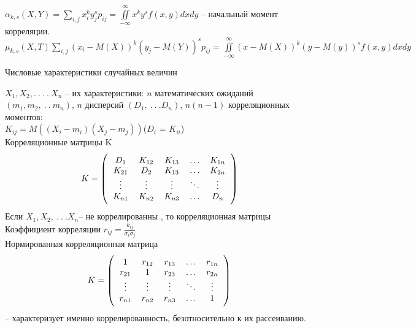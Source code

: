 \documentclass[russian, 12pt, fleqn]{article}
\begin{document}
$\alpha_{k,s} (X,Y) = \sum\limits_{i, j} x_i^k y_j^s p_{ij} =  \displaystyle{\iint\limits_{-\infty}^{\infty}} x^k y^s f(x, y) dx dy  $ -- начальный момент корреляции.\\ 
$\mu_{k,s}(X, T)  \sum\limits_{i, j} (x_i - M(X))^k (y_j - M(Y))^s p_{i j} = \displaystyle{\iint\limits_{-\infty}^{\infty}}(x-M(X))^k(y-M(y))^s f(x, y) dxdy$
\begin{center}
$\textbf{Числовые характеристики случайных величин}$
\end{center}
$X_1, X_2, .\ .\ .\ .\ X_n$ -- их характеристики: $n$ математических ожиданий $(m_1, m_2, \ .\ . \  m_n)$, $n$ дисперсий $(D_1, \ .\ .\ . D_n)$,  $n(n-1)$ корреляционных моментов:\\
$K_{ij} = M((X_i - m_i)(X_j - m_j))$($D_i$ = $K_{ii}$)\\
Корреляционные матрицы K
$$
K=\left(\begin{tabular}{c c c c c}
\(D_1\) & \(K_{12}\) & \(K_{13}\) & \(\ldots\) & \(K_{1n}\) \\
\(K_{21}\) &\( D_2\) & \(K_{13}\) & \(\ldots\) &\( K_{2n}\)\\
\(\vdots\) & \(\vdots\) & \(\vdots\) & \(\ddots\) & \(\vdots\) \\
\(K_{n1}\)& \(K_{n2}\) &\( K_{n3}\) & \(\ldots\) & \(D_n\)\\
\end{tabular}\right)$$
Если $X_1, X_2, \ .\ .\ . X_n$-- не коррелированны , то корреляционная матрицы 
Коэффициент корреляции $r_{ij} = \frac{k_{ij}}{\sigma_i \sigma_j}$\\
Нормированная корреляционная матрица
$$
K=\left(\begin{tabular}{c c c c c}
\(1\) & \(r_{12}\) & \(r_{13}\) & \(\ldots\) & \(r_{1n}\) \\
\(r_{21}\) &\(1\) & \(r_{23}\) & \(\ldots\) &\( r_{2n}\)\\
\(\vdots\) & \(\vdots\) & \(\vdots\) & \(\ddots\) & \(\vdots\) \\
\(r_{n1}\)& \(r_{n2}\) &\( r_{n3}\) & \(\ldots\) & \(1\)\\
\end{tabular}\right)$$
-- характеризует именно коррелированность, безотносительно  к их рассеиванию.



\end{document}
